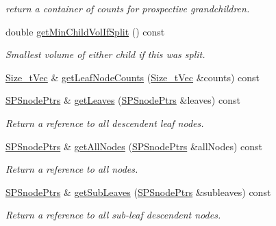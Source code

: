 \begin{DoxyCompactItemize}
\begin{DoxyCompactList}\small\item\em return a container of counts for prospective grandchildren. \end{DoxyCompactList}\item 
double \hyperlink{classsubpavings_1_1SPSnode_abd4de519f005b145ef131f0c9d4331a0}{get\-Min\-Child\-Vol\-If\-Split} () const 
\begin{DoxyCompactList}\small\item\em \-Smallest volume of either child if this was split. \end{DoxyCompactList}\item 
\hyperlink{namespacesubpavings_a612fc5639b45583b9fd33bd304354f81}{\-Size\-\_\-t\-Vec} \& \hyperlink{classsubpavings_1_1SPSnode_a2f8ce829fd9ba3ef3838d640ae201e9e}{get\-Leaf\-Node\-Counts} (\hyperlink{namespacesubpavings_a612fc5639b45583b9fd33bd304354f81}{\-Size\-\_\-t\-Vec} \&counts) const 
\item 
\hyperlink{namespacesubpavings_ad23942a388da964ca7487e496d0f2923}{\-S\-P\-Snode\-Ptrs} \& \hyperlink{classsubpavings_1_1SPSnode_a6a833240b503da0e2b640782e8671954}{get\-Leaves} (\hyperlink{namespacesubpavings_ad23942a388da964ca7487e496d0f2923}{\-S\-P\-Snode\-Ptrs} \&leaves) const 
\begin{DoxyCompactList}\small\item\em \-Return a reference to all descendent leaf nodes. \end{DoxyCompactList}\item 
\hyperlink{namespacesubpavings_ad23942a388da964ca7487e496d0f2923}{\-S\-P\-Snode\-Ptrs} \& \hyperlink{classsubpavings_1_1SPSnode_a8683fb9b17016cbe615408b51e791b9c}{get\-All\-Nodes} (\hyperlink{namespacesubpavings_ad23942a388da964ca7487e496d0f2923}{\-S\-P\-Snode\-Ptrs} \&all\-Nodes) const 
\begin{DoxyCompactList}\small\item\em \-Return a reference to all nodes. \end{DoxyCompactList}\item 
\hyperlink{namespacesubpavings_ad23942a388da964ca7487e496d0f2923}{\-S\-P\-Snode\-Ptrs} \& \hyperlink{classsubpavings_1_1SPSnode_af5ff16174902743a78b2d3db3e0a1c70}{get\-Sub\-Leaves} (\hyperlink{namespacesubpavings_ad23942a388da964ca7487e496d0f2923}{\-S\-P\-Snode\-Ptrs} \&subleaves) const 
\begin{DoxyCompactList}\small\item\em \-Return a reference to all sub-\/leaf descendent nodes. \end{DoxyCompactList}\item 

\end{DoxyCompactItemize}

